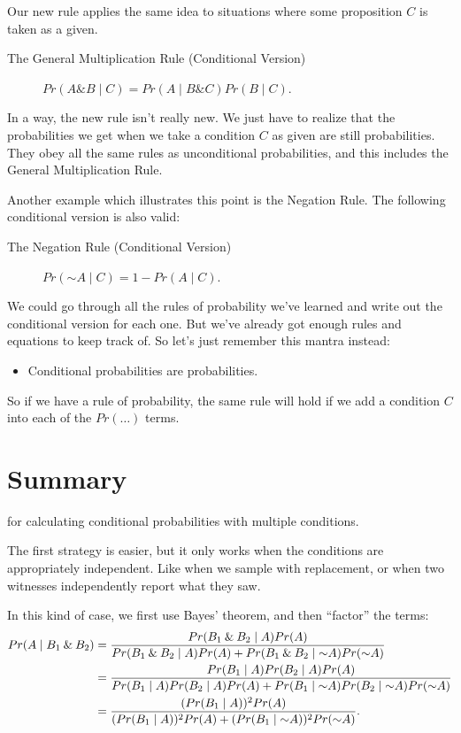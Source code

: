 \documentclass[justified]{tufte-book}
\newcommand{\given}{\mid}
\renewcommand{\neg}{\mathbin{\sim}}
\renewcommand{\wedge}{\mathbin{\&}}
\newcommand{\p}{Pr}
\newenvironment{info}{\begin{itemize}\item[\Info]}{\end{itemize}}
\theoremstyle{definition}
\theoremstyle{definition}
\theoremstyle{definition}
\theoremstyle{remark}
\begin{document}
Our new rule applies the same idea to situations where some proposition \(C\) is taken as a given.

\begin{description}
\item[The General Multiplication Rule (Conditional Version)]
\(\p(A \wedge B \given C) = \p(A \given B \wedge C) \p(B \given C).\)
\end{description}

In a way, the new rule isn't really new. We just have to realize that the probabilities we get when we take a condition \(C\) as given are still probabilities. They obey all the same rules as unconditional probabilities, and this includes the General Multiplication Rule.

Another example which illustrates this point is the Negation Rule. The following conditional version is also valid:

\begin{description}
\item[The Negation Rule (Conditional Version)]
\(\p(\neg A \given C) = 1 - \p(A \given C).\)
\end{description}

We could go through all the rules of probability we've learned and write out the conditional version for each one. But we've already got enough rules and equations to keep track of. So let's just remember this mantra instead:

\begin{info}
Conditional probabilities are probabilities.
\end{info}

So if we have a rule of probability, the same rule will hold if we add a condition \(C\) into each of the \(\p(\ldots)\) terms.

\hypertarget{summary-2}{%
\section{Summary}\label{summary-2}}

 for calculating conditional probabilities with multiple conditions.

The first strategy is easier, but it only works when the conditions are appropriately independent. Like when we sample with replacement, or when two witnesses independently report what they saw.

In this kind of case, we first use Bayes' theorem, and then ``factor'' the terms:
\[
  \begin{aligned}
    \p(A \given B_1 \wedge B_2) &= 
      \frac{\p(B_1 \wedge B_2 \given A)\p(A)}{%
            \p(B_1 \wedge B_2 \given A)\p(A) +%
              \p(B_1 \wedge B_2 \given \neg A)\p(\neg A)}\\
      &= \frac{\p(B_1 \given A)\p(B_2 \given A)\p(A)}{%
                \p(B_1 \given A)\p(B_2 \given A)\p(A) +%
                  \p(B_1 \given \neg A)\p(B_2 \given \neg A)\p(\neg A)}\\
      &= \frac{(\p(B_1 \given A))^2\p(A)}{%
                (\p(B_1 \given A))^2\p(A) +%
                  (\p(B_1 \given \neg A))^2\p(\neg A)}.
  \end{aligned}
\]
\end{document}

